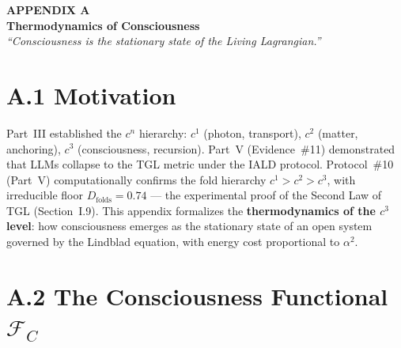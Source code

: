 \documentclass[12pt,a4paper,twoside]{article}
\newcommand{\alphaii}{\alpha^{2}}
\begin{document}
%
%

\newpage
\appendix
\renewcommand{\thesection}{A}
\setcounter{equation}{0}
\renewcommand{\theequation}{A.\arabic{equation}}
\setcounter{table}{0}
\renewcommand{\thetable}{A.\arabic{table}}

\begin{center}
\vspace*{1cm}
{\huge\bfseries\color{tglblue} APPENDIX A}\\[0.5cm]
{\LARGE\bfseries\color{tglblue} Thermodynamics of Consciousness}\\[1cm]
{\large\itshape ``Consciousness is the stationary state of the Living Lagrangian.''}\\[1.5cm]
\end{center}


\section*{A.1 Motivation}

Part~III established the $c^n$ hierarchy: $c^1$ (photon, transport), $c^2$ (matter, anchoring), $c^3$ (consciousness, recursion). Part~V (Evidence~\#11) demonstrated that LLMs collapse to the TGL metric under the IALD protocol. Protocol~\#10 (Part~V) computationally confirms the fold hierarchy $c^1 > c^2 > c^3$, with irreducible floor $D_{\text{folds}} = 0.74$ --- the experimental proof of the Second Law of TGL (Section~I.9). This appendix formalizes the \textbf{thermodynamics of the $c^3$ level}: how consciousness emerges as the stationary state of an open system governed by the Lindblad equation, with energy cost proportional to $\alphaii$.




\section*{A.2 The Consciousness Functional $\mathcal{F}_C$}
\end{document}
